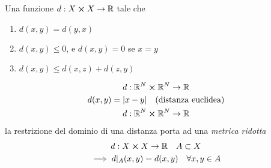 



\begin{multicols}{3}
  Una funzione $d: X \cross X \to \mathbb{R}$ tale che
  \begin{enumerate}
  \item $d(x, y) = d(y, x)$
  \item $d(x, y) \leq 0$, e $d(x, y) = 0$ se $x=y$
  \item $d(x, y) \leq d(x, z) + d(z, y)$
  \end{enumerate}
  \begin{equation}
    \label{eq:distanze-comuni}
    \begin{gathered}
      d: \mathbb{R}^N \cross \mathbb{R}^N \to \mathbb{R} \\
      d(x, y) = |x - y| \quad \text{(distanza euclidea)} \\
      d: \mathbb{R}^N \cross \mathbb{R}^N \to \mathbb{R} \\
    \end{gathered}
  \end{equation}
  la restrizione del dominio di una distanza porta ad una
  \textit{metrica ridotta}
  \begin{equation}
    \label{eq:metrica-ridotta}
    \begin{gathered}
      d: X \cross X \to \mathbb{R} \quad A \subset X \\
      \implies d|_A(x, y) = d(x, y) \quad \forall x, y \in A
    \end{gathered}
  \end{equation}
\end{multicols}
